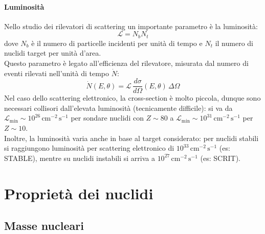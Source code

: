 \paragraph{Luminosità}

Nello studio dei rilevatori di scattering un importante parametro è la luminosità:
\begin{equation}
	\mathcal{L} = N_b N_t
	\label{eq:15}
\end{equation}
dove $ N_b $ è il numero di particelle incidenti per unità di tempo e $ N_t $ il numero di nuclidi target per unità d'area.\\
Questo parametro è legato all'efficienza del rilevatore, misurata dal numero di eventi rilevati nell'unità di tempo $ \dot{N} $:
\begin{equation}
	\dot{N} (E, \theta) = \mathcal{L}\, \frac{d\sigma}{d\Omega} (E,\theta) \,\Delta\Omega
	\label{eq:16}
\end{equation}
Nel caso dello scattering elettronico, la cross-section è molto piccola, dunque sono necessari collisori dall'elevata luminosità (tecnicamente difficile): si va da $ \mathcal{L}_{\text{min}} \sim 10^{26} \,\text{cm}^{-2} \,\text{s}^{-1} $ per sondare nuclidi con $ Z \sim 80 $ a $ \mathcal{L}_{\text{min}} \sim 10^{31} \,\text{cm}^{-2}\,\text{s}^{-1} $ per $ Z \sim 10 $.\\
Inoltre, la luminosità varia anche in base al target considerato: per nuclidi stabili si raggiungono luminosità per scattering elettronico di $ 10^{33} \,\text{cm}^{-2}\,\text{s}^{-1} $ (es: STABLE), mentre su nuclidi instabili si arriva a $ 10^{27} \,\text{cm}^{-2}\,\text{s}^{-1} $ (es: SCRIT).

\section{Proprietà dei nuclidi}

\subsection{Masse nucleari}

